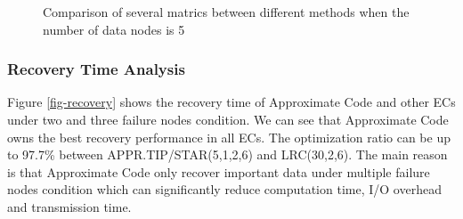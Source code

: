 \documentclass[sigconf]{acmart}
\begin{document}
\begin{figure}[!ht]
    \caption{Comparison of several matrics between different methods when the number of data nodes is 5}\label{fig-BAR}
    \end{figure}

\subsubsection{Recovery Time Analysis}

Figure \ref{fig-recovery} shows the recovery time of Approximate Code and other ECs under two and three failure nodes
condition. We can see that Approximate Code owns the best recovery performance in all ECs. The optimization ratio can be up to 97.7\% between APPR.TIP/STAR(5,1,2,6) and LRC(30,2,6). The main reason is that Approximate Code only recover important data under multiple failure nodes condition which can significantly reduce computation time, I/O overhead and transmission time.
\end{document}
